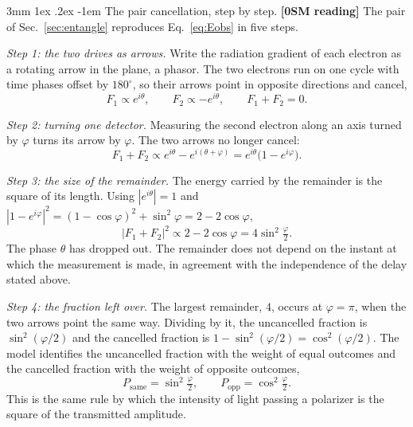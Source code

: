 \documentclass[%
 reprint, amsmath,amssymb, aps, prb, ]{revtex4-2}
\makeatletter
\numberwithin{equation}{section}
\renewcommand\paragraph{%
  \@startsection{paragraph}{4}{\z@}%
    {3mm \@plus 1ex \@minus .2ex}%
    {-1em}%
    {\normalfont\normalsize\itshape}}
\makeatother
\begin{document}
\paragraph{The pair cancellation, step by step.} \textbf{[0SM reading]} The pair of Sec.~\ref{sec:entangle} reproduces Eq.~\eqref{eq:Eobs} in five steps.

\emph{Step 1: the two drives as arrows.} Write the radiation gradient of each electron as a rotating arrow in the plane, a phasor. The two electrons run on one cycle with time phases offset by $180^\circ$, so their arrows point in opposite directions and cancel,
\begin{equation}
F_1\propto e^{i\theta},\qquad F_2\propto-e^{i\theta},\qquad F_1+F_2=0 .
\end{equation}

\emph{Step 2: turning one detector.} Measuring the second electron along an axis turned by $\varphi$ turns its arrow by $\varphi$. The two arrows no longer cancel:
\begin{equation}
F_1+F_2\propto e^{i\theta}-e^{i(\theta+\varphi)}=e^{i\theta}\big(1-e^{i\varphi}\big).
\end{equation}

\emph{Step 3: the size of the remainder.} The energy carried by the remainder is the square of its length. Using $|e^{i\theta}|=1$ and $|1-e^{i\varphi}|^2=(1-\cos\varphi)^2+\sin^2\varphi=2-2\cos\varphi$,
\begin{equation}
\big|F_1+F_2\big|^2\propto 2-2\cos\varphi=4\sin^2\!\tfrac{\varphi}{2}.
\label{eq:residual}
\end{equation}
The phase $\theta$ has dropped out. The remainder does not depend on the instant at which the measurement is made, in agreement with the independence of the delay stated above.

\emph{Step 4: the fraction left over.} The largest remainder, $4$, occurs at $\varphi=\pi$, when the two arrows point the same way. Dividing by it, the uncancelled fraction is $\sin^2(\varphi/2)$ and the cancelled fraction is $1-\sin^2(\varphi/2)=\cos^2(\varphi/2)$. The model identifies the uncancelled fraction with the weight of equal outcomes and the cancelled fraction with the weight of opposite outcomes,
\begin{equation}
P_{\mathrm{same}}=\sin^2\!\tfrac{\varphi}{2},\qquad P_{\mathrm{opp}}=\cos^2\!\tfrac{\varphi}{2}.
\label{eq:Psame}
\end{equation}
This is the same rule by which the intensity of light passing a polarizer is the square of the transmitted amplitude.
\end{document}
